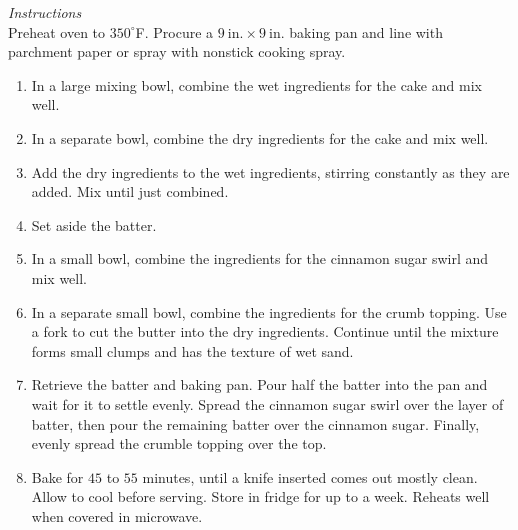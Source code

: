 \documentclass{article}
\makeatletter
\newcommand{\spewfootnotes}{%
\tfn@tablefootnoteprintout%
\global\let\tfn@tablefootnoteprintout\relax%
\gdef\tfn@fnt{0}%
}
\newcommand{\instructions}[1][\Large\emph{Instructions}]{%
    \emph{#1}\\}
\newcommand{\temp}[1]{%
    $#1^\circ$F}
\makeatother
\begin{document}
\begin{minipage}{\textwidth}
\instructions
Preheat oven to \temp{350}. Procure a $9~\mathrm{in.}\times9~\mathrm{in.}$ baking pan and line with parchment paper or spray with nonstick cooking spray.
\begin{enumerate}
    \item In a large mixing bowl, combine the wet ingredients for the cake and mix well.
    \item In a separate bowl, combine the dry ingredients for the cake and mix well.
    \item Add the dry ingredients to the wet ingredients, stirring constantly as they are added. Mix until just combined.
    \item Set aside the batter.
    \item In a small bowl, combine the ingredients for the cinnamon sugar swirl and mix well.
    \item In a separate small bowl, combine the ingredients for the crumb topping. Use a fork to cut the butter into the dry ingredients. Continue until the mixture forms small clumps and has the texture of wet sand.
    \item Retrieve the batter and baking pan. Pour half the batter into the pan and wait for it to settle evenly. Spread the cinnamon sugar swirl over the layer of batter, then pour the remaining batter over the cinnamon sugar. Finally, evenly spread the crumble topping over the top.
    \item Bake for $45$ to $55$ minutes, until a knife inserted comes out mostly clean. Allow to cool before serving. Store in fridge for up to a week. Reheats well when covered in microwave.
\end{enumerate}

\spewfootnotes
\end{minipage}
\end{document}
